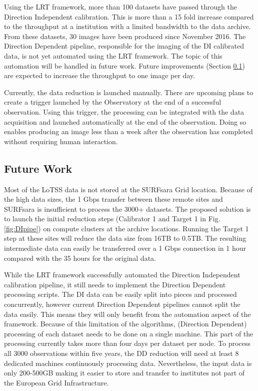 Using the LRT framework, more than 100 datasets have passed through the Direction Independent calibration. This is more than a 15 fold increase compared to the throughput at a institution with a limited bandwidth to the data archive. From these datasets, 30 images have been produced since November 2016.  The Direction Dependent pipeline, responsible for the imaging of the DI calibrated data, is not yet automated using the LRT framework. The topic of this automation will be handled in future work. Future improvements (Section \ref{sec:future}) are expected to increase the throughput to one image per day.  

Currently, the data reduction is launched manually. There are upcoming plans to create a trigger launched by the Observatory at the end of a successful observation. Using this trigger, the processing can be integrated with the data acquisition and launched automatically at the end of the observation. Doing so enables producing an image less than a week after the observation has completed without requiring human interaction. 
% 
\subsection{Future Work}\label{sec:future}


Most of the LoTSS data is not stored at the SURFsara Grid location. Because of the high data sizes, the 1 Gbps transfer between these remote sites and SURFsara is insufficient to process the 3000+ datasets. The proposed solution is to launch the initial reduction steps (Calibrator 1 and Target 1 in Fig.\ref{fig:DIpipe}) on compute clusters at the archive locations. Running the Target 1 step at these sites will reduce the data size from 16TB to 0.5TB. The resulting intermediate data can easily be transferred over a 1 Gbps connection in 1 hour compared with the 35 hours for the original data. 

While the LRT framework successfully automated the Direction Independent calibration pipeline, it still needs to  implement the Direction Dependent processing scripts. The DI data can be easily split into pieces and processed concurrently, however current Direction Dependent pipelines cannot split the data easily. This means they will only benefit from the automation aspect of the framework. Because of this limitation of the algorithms, (Direction Dependent) processing of each dataset needs to be done on a single machine.  This part of the processing currently takes more than four days per dataset per node. To process all 3000 observations within five years, the DD reduction will need at least 8 dedicated machines continuously processing data. Nevertheless, the input data is only 200-500GB making it easier to store and transfer to institutes not part of the European Grid Infrastructure. 

